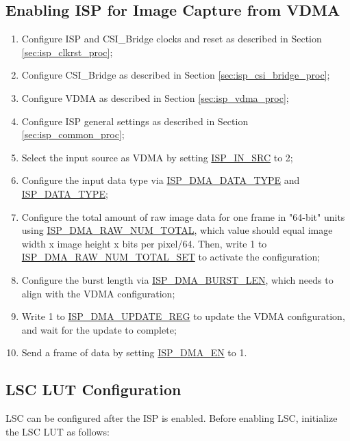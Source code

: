 \documentclass[main\_\_EN.tex]{subfiles}
\begin{document}
\subsection{Enabling ISP for Image Capture from VDMA}
\begin{enumerate}
    \item Configure ISP and CSI\_Bridge clocks and reset as described in Section \ref{sec:isp_clkrst_proc};

    \item Configure CSI\_Bridge as described in Section \ref{sec:isp_csi_bridge_proc};

    \item Configure VDMA as described in Section \ref{sec:isp_vdma_proc};

    \item Configure ISP general settings as described in Section \ref{sec:isp_common_proc};

    \item Select the input source as VDMA by setting \hyperref[fielddesc:ISPINSRC]{ISP\_IN\_SRC} to 2;

    \item Configure the input data type via \hyperref[fielddesc:ISPDMADATATYPE]{ISP\_DMA\_DATA\_TYPE} and \hyperref[fielddesc:ISPDATATYPE]{ISP\_DATA\_TYPE};

    \item Configure the total amount of raw image data for one frame in "64-bit" units using \hyperref[fielddesc:ISPDMARAWNUMTOTAL]{ISP\_DMA\_RAW\_NUM\_TOTAL}, which value should equal image width x image height x bits per pixel/64. Then, write 1 to \hyperref[fielddesc:ISPDMARAWNUMTOTALSET]{ISP\_DMA\_RAW\_NUM\_TOTAL\_SET} to activate the configuration;
    
    \item Configure the burst length via \hyperref[fielddesc:ISPDMABURSTLEN]{ISP\_DMA\_BURST\_LEN}, which needs to align with the VDMA configuration;
    
    \item Write 1 to \hyperref[fielddesc:ISPDMAUPDATEREG]{ISP\_DMA\_UPDATE\_REG} to update the VDMA configuration, and wait for the update to complete;

    \item Send a frame of data by setting \hyperref[fielddesc:ISPDMAEN]{ISP\_DMA\_EN} to 1.
\end{enumerate}


\subsection{LSC LUT Configuration}
LSC can be configured after the ISP is enabled. Before enabling LSC, initialize the LSC LUT as follows:
\end{document}
